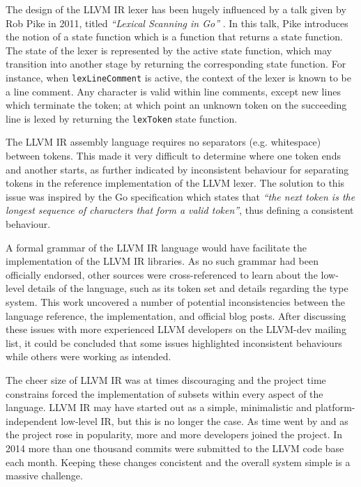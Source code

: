 The design of the LLVM IR lexer has been hugely influenced by a talk given by Rob Pike in 2011, titled \textit{``Lexical Scanning in Go''} \cite{lexical_scanning_in_go}. In this talk, Pike introduces the notion of a state function which is a function that returns a state function. The state of the lexer is represented by the active state function, which may transition into another stage by returning the corresponding state function. For instance, when \texttt{lexLineComment} is active, the context of the lexer is known to be a line comment. Any character is valid within line comments, except new lines which terminate the token; at which point an unknown token on the succeeding line is lexed by returning the \texttt{lexToken} state function.


The LLVM IR assembly language requires no separators (e.g. whitespace) between tokens. This made it very difficult to determine where one token ends and another starts, as further indicated by inconsistent behaviour for separating tokens in the reference implementation of the LLVM lexer. The solution to this issue was inspired by the Go specification which states that \textit{``the next token is the longest sequence of characters that form a valid token''}, thus defining a consistent behaviour.

A formal grammar of the LLVM IR language would have facilitate the implementation of the LLVM IR libraries. As no such grammar had been officially endorsed, other sources were cross-referenced to learn about the low-level details of the language, such as its token set and details regarding the type system. This work uncovered a number of potential inconsistencies between the language reference, the implementation, and official blog posts. After discussing these issues with more experienced LLVM developers on the LLVM-dev mailing list, it could be concluded that some issues highlighted inconsistent behaviours while others were working as intended.


The cheer size of LLVM IR was at times discouraging and the project time constrains forced the implementation of subsets within every aspect of the language. LLVM IR may have started out as a simple, minimalistic and platform-independent low-level IR, but this is no longer the case. As time went by and as the project rose in popularity, more and more developers joined the project. In 2014 more than one thousand commits were submitted to the LLVM code base each month. Keeping these changes concistent and the overall system simple is a massive challenge.

